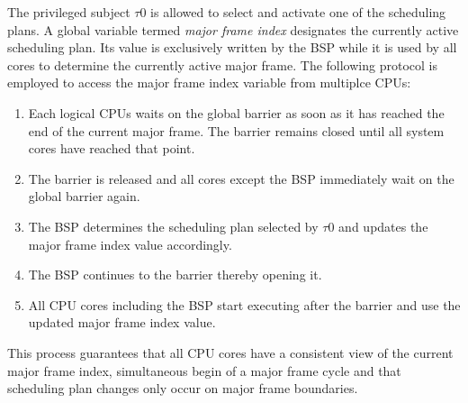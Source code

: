 The privileged subject $\tau$0 is allowed to select and activate one of the
scheduling plans. A global variable termed \emph{major frame index} designates
the currently active scheduling plan. Its value is exclusively written by the
BSP while it is used by all cores to determine the currently active major frame.
The following protocol is employed to access the major frame index variable from
multiplce CPUs:

\begin{enumerate}
	\item Each logical CPUs waits on the global barrier as soon as it has
		reached the end of the current major frame. The barrier remains closed
		until all system cores have reached that point.
	\item The barrier is released and all cores except the BSP immediately wait
		on the global barrier again.
	\item The BSP determines the scheduling plan selected by $\tau$0 and updates
		the major frame index value accordingly.
	\item The BSP continues to the barrier thereby opening it.
	\item All CPU cores including the BSP start executing after the barrier and
		use the updated major frame index value.
\end{enumerate}

This process guarantees that all CPU cores have a consistent view of the current
major frame index, simultaneous begin of a major frame cycle and that scheduling
plan changes only occur on major frame boundaries.


